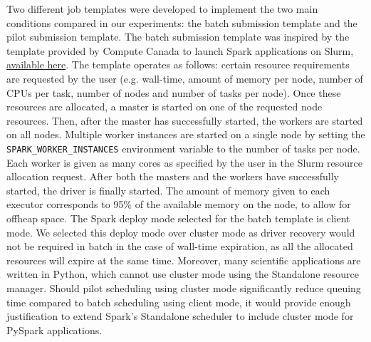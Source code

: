 	Two different job templates were developed to implement the two main
	conditions compared in our experiments: the batch submission template
	and the pilot submission template. The batch submission template was
	inspired by the template provided by Compute Canada to launch Spark
	applications on Slurm,
	\href{https://docs.computecanada.ca/wiki/Apache\_Spark/en}{available
	here}. The template operates as follows: certain resource requirements
	are requested by the user (e.g. wall-time, amount of memory per node,
	number of CPUs per task, number of nodes and number of tasks per node).
	Once these resources are allocated, a master is started on one of the
	requested node resources. Then, after the master has successfully
	started, the workers are started on all nodes. Multiple worker instances
	are started on a single node by setting the
	\texttt{SPARK\_WORKER\_INSTANCES} environment variable to the number of
	tasks per node. Each worker is given as many cores as specified by the
	user in the Slurm resource allocation request. After both the masters
	and the workers have successfully started, the driver is finally
	started. The amount of memory given to each executor corresponds to 95\%
	of the available memory on the node, to allow for offheap space. The
	Spark deploy mode selected for the batch template is client mode. We
	selected this deploy mode over cluster mode as driver recovery would not
	be required in batch in the case of wall-time expiration, as all the
	allocated resources will expire at the same time. Moreover, many
	scientific applications are written in Python, which cannot use cluster
	mode using the Standalone resource manager. Should pilot scheduling
	using cluster mode significantly reduce queuing time compared to batch
	scheduling using client mode, it would provide enough justification to
	extend Spark's Standalone scheduler to include cluster mode for PySpark
	applications.
    
